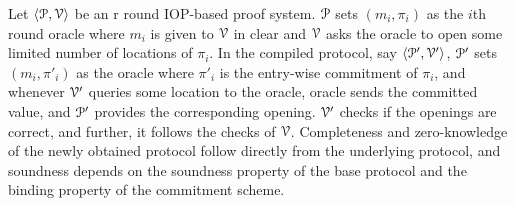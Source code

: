 

Let $\langle \mathcal{P},\mathcal{V}\rangle$ be an r round IOP-based proof system. $\mathcal{P}$ sets $(m_i, \pi_i)$ as the $i$th round oracle where $m_i$ is given to $\mathcal{V}$ in clear and $\mathcal{V}$ asks the oracle to open some limited number of locations of $\pi_i$. In the compiled protocol, say $\langle \mathcal{P}',\mathcal{V}'\rangle$, $\mathcal{P}'$ sets $(m_i, \pi'_i)$ as the oracle where $\pi'_i$ is the entry-wise commitment of $\pi_i$, and whenever $\mathcal{V}'$ queries some location to the oracle, oracle sends the committed value, and $\mathcal{P}'$ provides the corresponding opening. $\mathcal{V}'$ checks if the openings are correct, and further, it follows the checks of $\mathcal{V}$. Completeness and zero-knowledge of the newly obtained protocol follow directly from the underlying protocol, and soundness depends on the soundness property of the base protocol and the binding property of the commitment scheme. 

